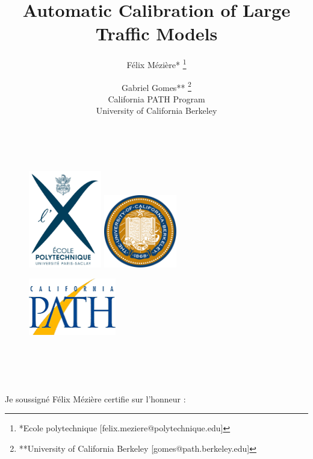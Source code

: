 

\usepackage{morefloats}
\usepackage[utf8]{inputenc} 
\usepackage[T1]{fontenc}
\usepackage{lmodern}
\usepackage{graphicx}
\usepackage{units}
\usepackage{amsmath}
\usepackage{array}
\usepackage{textcomp}
\usepackage{multirow}
\usepackage{afterpage,lipsum}





\title{Automatic Calibration of Large Traffic Models}

\author{Félix Mézière* \thanks{*Ecole polytechnique [felix.meziere@polytechnique.edu]} \and Gabriel Gomes** \thanks{**University of California Berkeley [gomes@path.berkeley.edu]} \\California PATH Program \\ University of California Berkeley} 

\maketitle
~\\
\begin{figure}[!h]
	\centering
	\includegraphics[width=1.25in]{figures/x.jpg}
	\includegraphics[width=1.25in]{figures/ucb.png}
\end{figure}
\begin{figure}[!h]
	\centering
	\includegraphics[width=1.5in]{figures/path.png}
\end{figure}
~\\
~\\
~\\
~\\
Je soussigné Félix Mézière certifie sur l’honneur :\\

